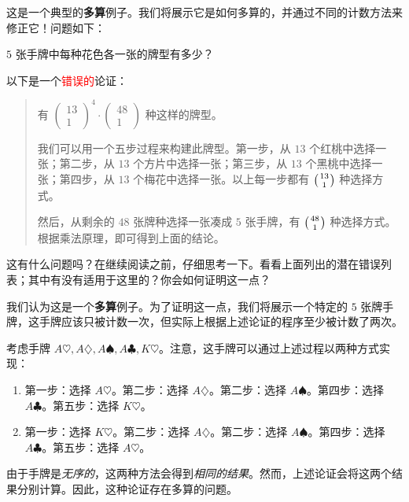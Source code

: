 \begin{example}\label{ex:example8.3.6}
    这是一个典型的\textbf{多算}例子。我们将展示它是如何多算的，并通过不同的计数方法来修正它！问题如下：

    $5$ 张手牌中每种花色各一张的牌型有多少？

    以下是一个\textcolor{red}{错误的}论证：

    \begin{quote}\color{red}
        有 $\begin{pmatrix}
                13 \\
                1
            \end{pmatrix}^4 \cdot \begin{pmatrix}
                48 \\
                1
            \end{pmatrix}$ 种这样的牌型。

        我们可以用一个五步过程来构建此牌型。第一步，从 $13$ 个红桃中选择一张；第二步，从 $13$ 个方片中选择一张；第三步，从 $13$ 个黑桃中选择一张；第四步，从 $13$ 个梅花中选择一张。以上每一步都有 $\big({13 \atop 1}\big)$ 种选择方式。

        然后，从剩余的 $48$ 张牌种选择一张凑成 $5$ 张手牌，有 $\big({48 \atop 1}\big)$ 种选择方式。根据乘法原理，即可得到上面的结论。
    \end{quote}


    这有什么问题吗？在继续阅读之前，仔细思考一下。看看上面列出的潜在错误列表；其中有没有适用于这里的？你会如何证明这一点？

    我们认为这是一个\textbf{多算}例子。为了证明这一点，我们将展示一个特定的 $5$ 张牌手牌，这手牌应该只被计数一次，但实际上根据上述论证的程序至少被计数了两次。

    考虑手牌 $A\heartsuit, A\diamondsuit, A\spadesuit, A\clubsuit, K\heartsuit$。注意，这手牌可以通过上述过程以两种方式实现：
    \begin{enumerate}[label=(\arabic*)]
        \item 第一步：选择 $A\heartsuit$。第二步：选择 $A\diamondsuit$。第二步：选择 $A\spadesuit$。第四步：选择 $A\clubsuit$。第五步：选择 $K\heartsuit$。
        \item 第一步：选择 $K\heartsuit$。第二步：选择 $A\diamondsuit$。第二步：选择 $A\spadesuit$。第四步：选择 $A\clubsuit$。第五步：选择 $A\heartsuit$。
    \end{enumerate}
    由于手牌是\emph{无序的}，这两种方法会得到\emph{相同的结果}。然而，上述论证会将这两个结果分别计算。因此，这种论证存在多算的问题。


\end{example}
